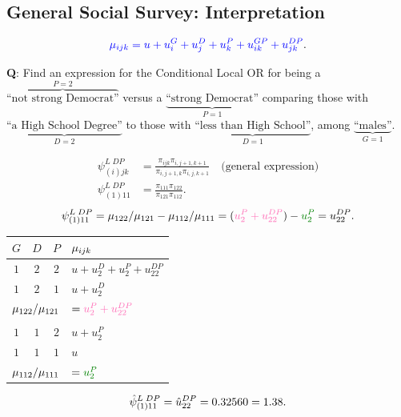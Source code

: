 \documentclass{article}\usepackage[]{graphicx}\usepackage[svgnames]{xcolor}
\let\exp\relax%
\let\log\relax%
\begin{document}
\subsection*{General Social Survey: Interpretation}
\[ \textcolor{Blue}{\log{\mu_{ijk}}=u+u_i^G+u_j^D+u_k^P+u_{ik}^{GP}+u_{jk}^{DP}}. \]
\begin{Example}{}
    \textbf{Q}: Find an expression for the Conditional Local OR for being a $ \overbrace{\text{``not strong Democrat''}}^{P=2} $
    versus a $ \underbrace{\text{``strong Democrat''}}_{P=1} $ comparing those with $ \underbrace{\text{``a High School Degree''}}_{D=2} $
    to those with $ \underbrace{\text{``less than High School''}}_{D=1} $, among $ \underbrace{\text{``males''}}_{G=1} $.
\end{Example}
\begin{align*}
    \psi_{(i)jk}^{L\; DP} & =\frac{\pi_{ijk}\pi_{i,j+1,k+1}}{\pi_{i,j+1,k}\pi_{i,j,k+1}}\quad\text{(general expression)} \\
    \psi_{(1)11}^{L\; DP} & =\frac{\pi_{111}\pi_{122}}{\pi_{121}\pi_{112}}.
\end{align*}
\[ \log{\psi_{(1)11}^{L\; DP}}=\log{\mu_{122}/\mu_{121}}-\log{\mu_{112}/\mu_{111}}=(\textcolor{HotPink}{u_2^P+u_{22}^{DP}})-\textcolor{Green}{u_2^P}=u_{22}^{DP}. \]
\begin{table}[H]
    \centering
    \begin{tabular}{cccl}
        $ G $                                             & $ D $                                       & $ P $ & $ \log{\mu_{ijk}} $           \\
        \midrule
        $ 1 $                                             & $ 2 $                                       & $ 2 $ & $ u+u_2^D+u_2^P+u_{22}^{DP} $ \\
        $ 1 $                                             & $ 2 $                                       & $ 1 $ & $ u+u_2^D $                   \\
        \midrule
        \multicolumn{3}{c}{$ \log{\mu_{122}/\mu_{121}} $} & $ =\textcolor{HotPink}{u_2^P+u_{22}^{DP}} $                                         \\\\
        \midrule
        $ 1 $                                             & $ 1 $                                       & $ 2 $ & $ u+u_2^P $                   \\
        $ 1 $                                             & $ 1 $                                       & $ 1 $ & $ u $                         \\
        \midrule
        \multicolumn{3}{c}{$ \log{\mu_{112}/\mu_{111}} $} & $ =\textcolor{Green}{u_2^P} $
    \end{tabular}
\end{table}
\[ \hat{\psi}_{(1)11}^{L\;DP}=\exp{\hat{u}_{22}^{DP}}=\exp{0.32560}=1.38. \]
\end{document}
